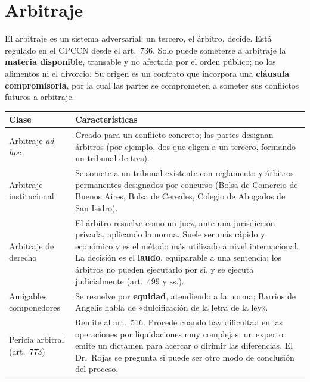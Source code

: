 \documentclass[12pt,oneside]{book}
\renewcommand{\arraystretch}{1.15}
\begin{document}
\section{Arbitraje}

El arbitraje es un sistema adversarial: un tercero, el árbitro, decide. Está regulado en el CPCCN desde el art.~736. Solo puede someterse a arbitraje la \textbf{materia disponible}, transable y no afectada por el orden público; no los alimentos ni el divorcio. Su origen es un contrato que incorpora una \textbf{cláusula compromisoria}, por la cual las partes se comprometen a someter sus conflictos futuros a arbitraje.

\begin{table}[H]
\centering
\renewcommand{\arraystretch}{1.25}
\begin{tabularx}{\textwidth}{>{\RaggedRight\arraybackslash}p{}>{\RaggedRight\arraybackslash}X}
\toprule
\textbf{Clase} & \textbf{Características} \\
\midrule
Arbitraje \textit{ad hoc} & Creado para un conflicto concreto; las partes designan árbitros (por ejemplo, dos que eligen a un tercero, formando un tribunal de tres). \\
\addlinespace
Arbitraje institucional & Se somete a un tribunal existente con reglamento y árbitros permanentes designados por concurso (Bolsa de Comercio de Buenos Aires, Bolsa de Cereales, Colegio de Abogados de San Isidro). \\
\addlinespace
Arbitraje de derecho & El árbitro resuelve como un juez, ante una jurisdicción privada, aplicando la norma. Suele ser más rápido y económico y es el método más utilizado a nivel internacional. La decisión es el \textbf{laudo}, equiparable a una sentencia; los árbitros no pueden ejecutarlo por sí, y se ejecuta judicialmente (art.~499 y ss.). \\
\addlinespace
Amigables componedores & Se resuelve por \textbf{equidad}, atendiendo a la norma; Barrios de Angelis habla de «dulcificación de la letra de la ley». \\
\addlinespace
Pericia arbitral (art.~773) & Remite al art.~516. Procede cuando hay dificultad en las operaciones por liquidaciones muy complejas: un experto emite un dictamen para acercar o dirimir las diferencias. El Dr.~Rojas se pregunta si puede ser otro modo de conclusión del proceso. \\
\bottomrule
\end{tabularx}
\end{table}
\end{document}
